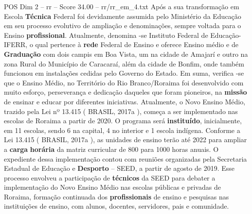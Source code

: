 \begin{textsample}{POS Dim 2 – rr – Score 34.00 – rr/rr\_em\_4.txt}
Após a sua transformação em Escola \textbf{Técnica} Federal foi devidamente assumida pelo Ministério da Educação em seu processo evolutivo de ampliação e denominações, sempre voltada para o Ensino \textbf{profissional}.
Atualmente, denomina -se Instituto Federal de Educação- IFERR, o qual pertence à \textbf{rede} Federal de Ensino e oferece Ensino médio e de \textbf{Graduação} com dois campis em Boa Vista, um na cidade de Amajarí e outro na zona Rural do Município de Caracaraí, além da cidade de Bonfim, onde também funcionou em instalações cedidas pelo Governo do Estado.
Em suma, verifica -se que o Ensino Médio, no Território do Rio Branco/Roraima foi desenvolvido com muito esforço, perseverança e dedicação daqueles que foram pioneiros, na \textbf{missão} de ensinar e educar por diferentes iniciativas.
Atualmente, o Novo Ensino Médio, trazido pela Lei nº 13.415 ( BRASIL, 2017a ), começa a ser implementado nas escolas de Roraima a partir de 2020.
O programa será \textbf{instituído}, inicialmente, em 11 escolas, sendo 6 na capital, 4 no interior e 1 escola indígena.
Conforme a Lei 13.415 ( BRASIL, 2017a ), as unidades de ensino terão até 2022 para ampliar a \textbf{carga} \textbf{horária} da matriz curricular de 800 para 1000 horas anuais.
O expediente dessa implementação contou com reuniões organizadas pela Secretaria Estadual de Educação e \textbf{Desporto} – SEED, a partir de agosto de 2019.
Esse processo envolveu a participação de \textbf{técnicos} da SEED para debater a implementação do Novo Ensino Médio nas escolas públicas e privadas de Roraima, formação continuada dos \textbf{profissionais} de ensino e pesquisas nas instituições de ensino, com alunos, docentes, servidores, pais e comunidade.

\end{textsample}
